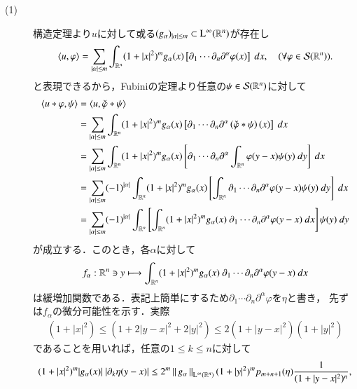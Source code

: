 	\begin{prf}\mbox{}
		\begin{description}
			\item[(1)] 構造定理より$u$に対して或る$(g_\alpha)_{|\alpha| \leq m} \subset \mathrm{L}^\infty(\mathbb{R}^n)$が存在し
			\begin{align}
				\inprod<u,\varphi> =
				\sum_{|\alpha| \leq m} \int_{\R^n} (1+|x|^2)^m g_\alpha(x) \left[ \partial_1 \cdots \partial_n \partial^\alpha \varphi(x) \right]\ dx,
				\quad (\forall \varphi \in \rapid{\R^n}).
			\end{align}
			と表現できるから，Fubiniの定理より任意の$\psi \in \mathcal{S}(\mathbb{R}^n)$に対して
			\begin{align}
				\inprod<u \ast \varphi,\psi> &= \inprod<u, \check{\varphi} \ast \psi> \\
				&= \sum_{|\alpha| \leq m} \int_{\R^n} (1+|x|^2)^m g_\alpha(x) \left[ \partial_1 \cdots \partial_n \partial^\alpha \left(\check{\varphi} \ast \psi\right)(x) \right]\ dx \\
				&= \sum_{|\alpha| \leq m} \int_{\R^n} (1+|x|^2)^m g_\alpha(x) \left[ \partial_1 \cdots \partial_n \partial^\alpha \int_{\R^n} \varphi(y-x) \psi (y)\ dy \right]\ dx \\
				&= \sum_{|\alpha| \leq m} (-1)^{|\alpha|} \int_{\R^n} (1+|x|^2)^m g_\alpha(x) \left[ \int_{\R^n} \partial_1 \cdots \partial_n \partial^\alpha\varphi(y-x) \psi (y)\ dy \right]\ dx \\
				&= \sum_{|\alpha| \leq m} (-1)^{|\alpha|} \int_{\R^n} \left[ \int_{\R^n} (1+|x|^2)^m g_\alpha(x)\ \partial_1 \cdots \partial_n \partial^\alpha\varphi(y-x)\ dx\right] \psi(y)\ dy
			\end{align}
			が成立する．このとき，各$\alpha$に対して
			\begin{align}
				f_\alpha:\R^n \ni y \longmapsto \int_{\R^n} (1+|x|^2)^m g_\alpha(x)\ \partial_1 \cdots \partial_n \partial^\alpha\varphi(y-x)\ dx
			\end{align}
			は緩増加関数である．表記上簡単にするため$\partial_1 \cdots \partial_n \partial^\alpha\varphi$を$\eta$と書き，
			先ずは$f_\alpha$の微分可能性を示す．実際
			\begin{align}
				(1+|x|^2) \leq (1 + 2|y-x|^2 + 2|y|^2) \leq 2(1+|y-x|^2)(1+|y|^2)
			\end{align}
			であることを用いれば，任意の$1 \leq k \leq n$に対して
			\begin{align}
				(1+|x|^2)^m |g_\alpha(x)|\ |\partial_k \eta(y-x)|
				\leq 2^m \Norm{g_\alpha}{\mathrm{L}^\infty(\R^n)} (1+|y|^2)^m p_{m+n+1}(\eta) \frac{1}{(1+|y-x|^2)^n},

\end{align}
\end{description}
\end{prf}
